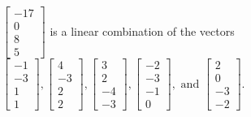 \begin{exercise}
\begin{exerciseStatement}
  \end{exerciseStatement}
  \begin{exerciseAnswer}
   \(\left[\begin{array}{c}
-17 \\
0 \\
8 \\
5
\end{array}\right]\) 
  	 is  
	a linear combination of the vectors \(\left[\begin{array}{c}
-1 \\
-3 \\
1 \\
1
\end{array}\right] , \left[\begin{array}{c}
4 \\
-3 \\
2 \\
2
\end{array}\right] , \left[\begin{array}{c}
3 \\
2 \\
-4 \\
-3
\end{array}\right] , \left[\begin{array}{c}
-2 \\
-3 \\
-1 \\
0
\end{array}\right] , \text{ and } \left[\begin{array}{c}
2 \\
0 \\
-3 \\
-2
\end{array}\right]\).

	
  


  \end{exerciseAnswer}
\end{exercise}